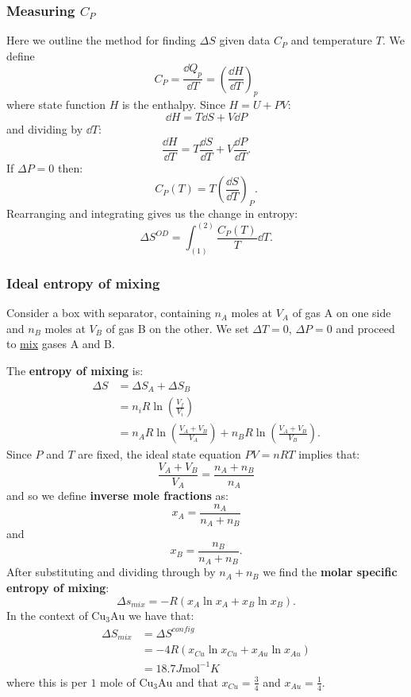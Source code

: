 \documentclass{article}
\begin{document}
\subsubsection{Measuring $C_P$}
Here we outline the method for finding $\Delta S$
given data $C_P$ and temperature $T$. We define
$$C_P=\frac{\dd Q_p}{\dd T}=\left(\frac{\dd H}{\dd T}\right)_p$$
where state function $H$ is the enthalpy. Since $H=U+PV$:
$$\dd H=T\dd S+V\dd P$$
and dividing by $\dd T$:
$$\frac{\dd H}{\dd T}=T\frac{\dd S}{\dd T}+V\frac{\dd P}{\dd T}.$$
If $\Delta P=0$ then:
$$C_P(T)=T\left(\frac{\dd S}{\dd T}\right)_P.$$
Rearranging and integrating gives us the change in entropy:
$$\Delta S^{OD}=\int_{(1)}^{(2)}\frac{C_P(T)}{T}\dd T.$$

\newpage

\subsubsection{Ideal entropy of mixing}
Consider a box with separator, containing $n_A$ moles at $V_A$ of gas A on one side and $n_B$ moles at $V_B$ of gas B on the other. We set $\Delta T=0$, $\Delta P=0$ and proceed to \underline{mix} gases A and B.

The \textbf{entropy of mixing} is:
\begin{align*}
    \Delta S
    &=\Delta S_A+\Delta S_B \\
    &=n_i R\ln\left(\frac{V_f}{V_i}\right) \\
    &=n_A R\ln\left(\frac{V_A+V_B}{V_A}\right)
    +n_B R\ln\left(\frac{V_A+V_B}{V_B}\right).
\end{align*}
Since $P$ and $T$ are fixed, the ideal state equation $PV=nRT$ implies that:
$$\frac{V_A+V_B}{V_A}=\frac{n_A+n_B}{n_A}$$
and so we define \textbf{inverse mole fractions} as:
$$x_A=\frac{n_A}{n_A+n_B}$$
and
$$x_B=\frac{n_B}{n_A+n_B}.$$
After substituting and dividing through by $n_A+n_B$ we find the \textbf{molar specific entropy of mixing}:
$$\Delta s_{mix}=-R(x_A\ln x_A+x_B\ln x_B).$$
In the context of $\text{Cu}_3\text{Au}$ we have that:
\begin{align*}
    \Delta S_{mix}
    &=\Delta S^{config} \\
    &=-4R(x_{Cu}\ln x_{Cu}+x_{Au}\ln x_{Au}) \\
    &=18.7J\text{mol}^{-1}K
\end{align*}
where this is per $1$ mole of
$\text{Cu}_3\text{Au}$ and that $x_{Cu}=\frac{3}{4}$
and $x_{Au}=\frac{1}{4}$.

\newpage
\end{document}
